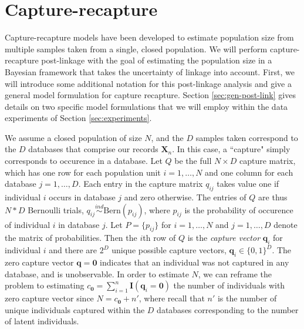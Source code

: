 \documentclass[11pt]{article}\usepackage[]{graphicx}\usepackage[]{color}
\begin{document}
\section{Capture-recapture}

Capture-recapture models have been developed to estimate population size from multiple samples taken from a single, closed population. We will perform capture-recapture post-linkage with the goal of estimating the population size in a Bayesian framework that takes the uncertainty of linkage into account. First, we will introduce some additional notation for this post-linkage analysis and give a general model formulation for capture recapture. Section \ref{sec:gen-post-link} gives details on two specific model formulations that we will employ within the data experiments of Section \ref{sec:experiments}.

We assume a closed population of size $N$, and the $D$ samples taken correspond to the $D$ databases that comprise our records $\boldsymbol X_n$. In this case, a ``capture" simply corresponds to occurence in a database. Let $Q$ be the full $N \times D$ capture matrix, which has one row for each population unit $i = 1, \dots, N$ and one column for each database $j = 1, \dots, D$. Each entry in the capture matrix $q_{ij}$ takes value one if individual $i$ occurs in database $j$ and zero otherwise. The entries of $Q$ are thus $N*D$ Bernoulli trials, $q_{ij}\stackrel{ind}{\sim} \text{Bern}(p_{ij})$, where $p_{ij}$ is the probability of occurence of individual $i$ in database $j$. Let $P = \{p_{ij}\}$ for $i = 1, \dots, N$ and $j = 1, \dots, D$ denote the matrix of probabilities. Then the $i$th row of $Q$ is the \emph{capture vector} $\boldsymbol q_i$ for individual $i$ and there are $2^D$ unique possible capture vectors, $\boldsymbol q_i \in \{0,1\}^D$. The zero capture vector $\boldsymbol q = \boldsymbol 0$ indicates that an individual was not captured in any database, and is unobservable. In order to estimate $N$, we can reframe the problem to estimating $c_{\boldsymbol 0} = \sum_{i = 1}^n \boldsymbol I(\boldsymbol q_i = \boldsymbol 0)$ the number of individuals with zero capture vector since $N = c_{\boldsymbol 0} + n'$, where recall that $n'$ is the number of unique individuals captured within the $D$ databases corresponding to the number of latent individuals.
\end{document}
